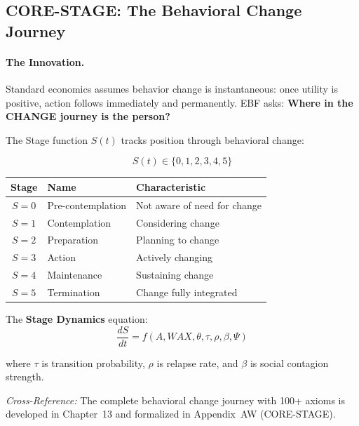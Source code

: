 \subsection{CORE-STAGE: The Behavioral Change Journey}
\label{sec:8c-stage}

\paragraph{The Innovation.}
Standard economics assumes behavior change is instantaneous: once utility is
positive, action follows immediately and permanently. EBF asks:
\textbf{Where in the CHANGE journey is the person?}

The Stage function $S(t)$ tracks position through behavioral change:

\begin{equation}
S(t) \in \{0, 1, 2, 3, 4, 5\}
\end{equation}

\begin{center}
\renewcommand{\arraystretch}{1.2}
\begin{tabular}{@{}cll@{}}
\toprule
\textbf{Stage} & \textbf{Name} & \textbf{Characteristic} \\
\midrule
$S = 0$ & Pre-contemplation & Not aware of need for change \\
$S = 1$ & Contemplation & Considering change \\
$S = 2$ & Preparation & Planning to change \\
$S = 3$ & Action & Actively changing \\
$S = 4$ & Maintenance & Sustaining change \\
$S = 5$ & Termination & Change fully integrated \\
\bottomrule
\end{tabular}
\end{center}

The \textbf{Stage Dynamics} equation:
\begin{equation}
\frac{dS}{dt} = f(A, WAX, \theta, \tau, \rho, \beta, \Psi)
\end{equation}

where $\tau$ is transition probability, $\rho$ is relapse rate, and $\beta$
is social contagion strength.

\textit{Cross-Reference:} The complete behavioral change journey with 100+ axioms is
developed in Chapter~13 and formalized in Appendix~AW (CORE-STAGE).


